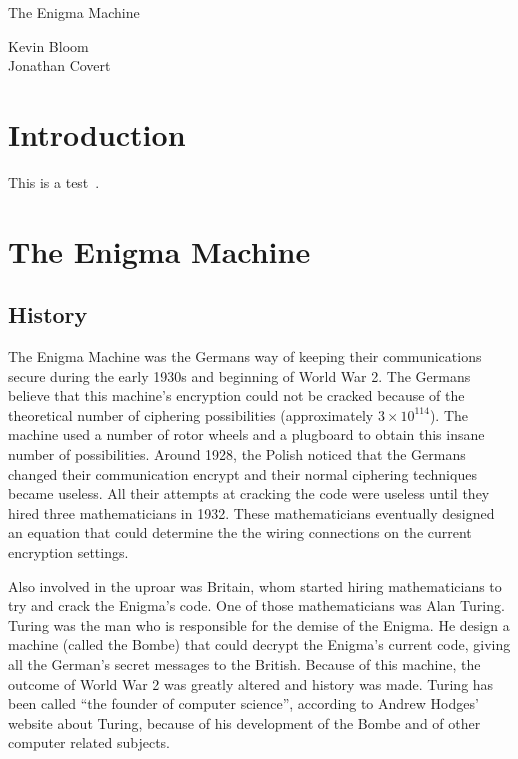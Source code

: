 \documentclass[12pt,a4paper,titlepage]{article}
\begin{document}
\pagestyle{headings}
\setcounter{page}{1}

\thispagestyle{empty}

\begin{flushleft}
\vspace*{1.5in}

{\huge The Enigma Machine}

\vspace{0.25in}

{\Large Kevin Bloom \\ Jonathan Covert}

\vspace{0.25in}

\vfill

\end{flushleft}

\newpage

\tableofcontents

\newpage

\section{Introduction}
This is a test~\cite{hold}.

\section{The Enigma Machine}

\subsection{History}
The Enigma Machine was the Germans way of keeping their communications secure
during the early 1930s and beginning of World War 2. The Germans believe that
this machine's encryption could not be cracked because of the theoretical number
of ciphering possibilities (approximately $3 \times 10^{114}$). The machine used a
number of rotor wheels and a plugboard to obtain this insane number of
possibilities. Around 1928, the Polish noticed that the Germans changed their
communication encrypt and their normal ciphering techniques became useless. All
their attempts at cracking the code were useless until they hired three
mathematicians in 1932. These mathematicians eventually designed an equation that
could determine the the wiring connections on the current encryption settings.

Also involved in the uproar was Britain, whom started hiring mathematicians to
try and crack the Enigma's code. One of those mathematicians was Alan Turing.
Turing was the man who is responsible for the demise of the Enigma. He design a
machine (called the Bombe) that could decrypt the Enigma's current code, giving
all the German's secret messages to the British. Because of this machine, the
outcome of World War 2 was greatly altered and history was made. Turing has been
called ``the founder of computer science'', according to Andrew Hodges' website
about Turing, because of his development of the Bombe and of other computer
related subjects.
\cite{wilcox2006solving}
\end{document}
